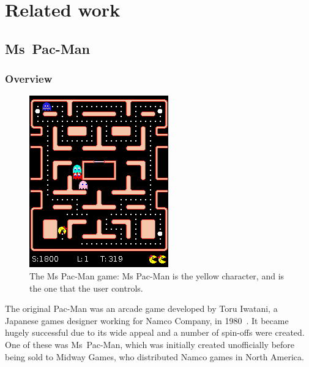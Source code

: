 \chapter{Related work}
\label{ch:related}


\section{Ms~Pac-Man}

\subsection{Overview}

\begin{figure}
\includegraphics[width=\linewidth]{diagrams/pac-man}
\caption[The Ms Pac-Man game]{The Ms Pac-Man game: Ms Pac-Man is the yellow character, and is the one that the user controls.}
\label{fig:pac-man}
\end{figure}

The original Pac-Man was an arcade game developed by Toru Iwatani, a Japanese games designer working for Namco Company, in 1980~\citep{Samothrakis2011}.  It became hugely successful due to its wide appeal and a number of spin-offs were created.  One of these was Ms~Pac-Man, which was initially created unofficially before being sold to Midway Games, who distributed Namco games in North America.

